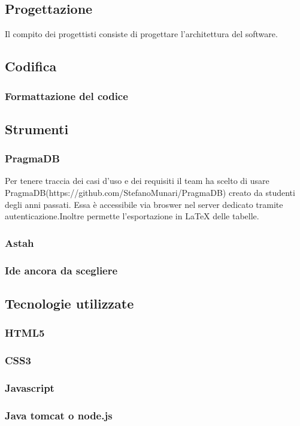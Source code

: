 	\subsection{Progettazione}
	Il compito dei progettisti consiste di progettare l'architettura del software. %
	
	\subsection{Codifica}
		\subsubsection{Formattazione del codice}
	\subsection{Strumenti}
		\subsubsection{PragmaDB}
		Per tenere traccia dei casi d'uso e dei requisiti il team ha scelto di usare PragmaDB(https://github.com/StefanoMunari/PragmaDB) creato da studenti degli anni passati. Essa è accessibile via broswer nel server dedicato tramite autenticazione.Inoltre permette l'esportazione in \LaTeX{} delle tabelle.
		\subsubsection{Astah}
		\subsubsection{Ide ancora da scegliere}
	\subsection{Tecnologie utilizzate}
	\subsubsection{HTML5}
	\subsubsection{CSS3}
	\subsubsection{Javascript}
	\subsubsection{Java tomcat o node.js}

